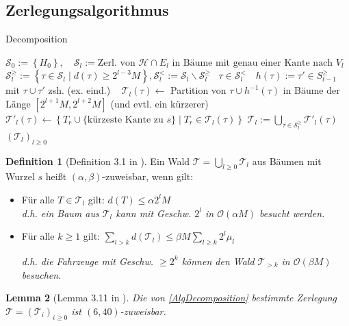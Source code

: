 \documentclass[a4paper,ngerman,12pt,bibtotoc]{scrartcl}
\newcommand{\LineFor}[2]{\State\algorithmicfor\ {#1}\ \algorithmicdo\ {#2} \algorithmicend\ \algorithmicfor}
\theoremstyle{definition}
\newtheorem{defn}{Definition}[section]
\theoremstyle{plain}
\newtheorem{lemma}[defn]{Lemma}
\theoremstyle{remark}
\newcommand{\Hc}{\mathcal{H}}
\newcommand{\Tc}{\mathcal{T}}
\newcommand{\Sc}{\mathcal{S}}
\newcommand{\Oc}{\mathcal{O}}
\begin{document}
	
	\subsection{Zerlegungsalgorithmus}
	
	\begin{algorithm}[H]
		\caption{Decomposition}\label{AlgDecomposition}
		\begin{algorithmic}[1]
			\Procedure{Decomposition}{$\left(\Hc\right)$}
			\State $\Sc_0 := \left\lbrace H_0 \right\rbrace,\quad \Sc_l := \text{Zerl. von } \Hc\cap E_l \text{ in Bäume mit genau einer Kante nach } V_l$
			\State $\Sc_l^{\geq} := \left\{\tau \in \Sc_l \mid d(\tau) \geq 2^{l-3}M\right\}, \Sc_l^< := \Sc_l \backslash \Sc_l^{\geq}$
			\LineFor{$\tau \in \Sc_l^{<}$}{$h(\tau) := \tau' \in S_{l-1}^{\geq}$ mit $\tau \cup \tau'$ zsh. (ex. eind.)}
			\For{$\tau \in \Sc_l^{\geq}$}
				\State $\Tc_l(\tau) \gets$ Partition von $\tau \cup h^{-1}(\tau)$ in Bäume der Länge $\left[2^{l+1}M, 2^{l+2}M\right]$ 
				\Statex \hspace{6.5em} (und evtl. ein kürzerer)
				\State $\Tc'_l(\tau) \gets \left\{T_r \cup \{\text{kürzeste Kante zu } s\} \mid T_r \in \Tc_l(\tau)\right\}$
			\EndFor
			\State $\Tc_l := \bigcup_{\tau \in \Sc_l^{\geq}}\Tc'_l(\tau)$
			\State \Return $\left(\Tc_l\right)_{l\geq 0}$
			\EndProcedure
		\end{algorithmic}
	\end{algorithm}
	
	\begin{defn}[Definition 3.1 in \cite{HetCVRP}]
		Ein Wald $\Tc = \bigcup_{l\geq 0} \Tc_l$ aus Bäumen mit Wurzel $s$ heißt $(\alpha, \beta)$-zuweisbar, wenn gilt:
		\begin{itemize}
			\item Für alle $T \in \Tc_l$ gilt: $d(T) \leq \alpha 2^l M$ \\
			\textit{d.h. ein Baum aus $\Tc_l$ kann mit Geschw. $2^l$ in $\Oc(\alpha M)$ besucht werden.}
			\item Für alle $k \geq 1$ gilt: $\sum_{l > k} d(\Tc_l) \leq \beta M \sum_{l\geq k} 2^l\mu_l$
			
			\textit{d.h. die Fahrzeuge mit Geschw. $\geq 2^k$ können den Wald $\Tc_{>k}$ in $\Oc(\beta M)$ besuchen.}
		\end{itemize}
	\end{defn}
	
	\begin{lemma}[Lemma 3.11 in \cite{HetCVRP}]
		Die von \cref{AlgDecomposition} bestimmte Zerlegung $\Tc = (\Tc_i)_{i\geq 0}$ ist $(6, 40)$-zuweisbar.
	\end{lemma}
	
\end{document}

